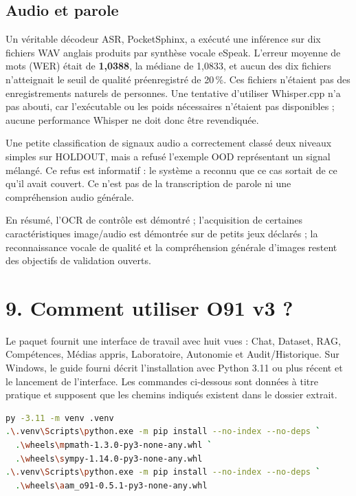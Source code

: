 \documentclass[11pt,a4paper]{article}
\begin{document}
\subsection*{Audio et parole}

Un véritable décodeur ASR, PocketSphinx, a exécuté une inférence sur dix fichiers WAV anglais produits par synthèse vocale eSpeak. L'erreur moyenne de mots (WER) était de \textbf{1,0388}, la médiane de 1,0833, et aucun des dix fichiers n'atteignait le seuil de qualité préenregistré de 20\,\%. Ces fichiers n'étaient pas des enregistrements naturels de personnes. Une tentative d'utiliser Whisper.cpp n'a pas abouti, car l'exécutable ou les poids nécessaires n'étaient pas disponibles ; aucune performance Whisper ne doit donc être revendiquée.

Une petite classification de signaux audio a correctement classé deux niveaux simples sur HOLDOUT, mais a refusé l'exemple OOD représentant un signal mélangé. Ce refus est informatif : le système a reconnu que ce cas sortait de ce qu'il avait couvert. Ce n'est pas de la transcription de parole ni une compréhension audio générale.

En résumé, l'OCR de contrôle est démontré ; l'acquisition de certaines caractéristiques image/audio est démontrée sur de petits jeux déclarés ; la reconnaissance vocale de qualité et la compréhension générale d'images restent des objectifs de validation ouverts.

\section*{9. Comment utiliser O91 v3 ?}

Le paquet fournit une interface de travail avec huit vues : Chat, Dataset, RAG, Compétences, Médias appris, Laboratoire, Autonomie et Audit/Historique. Sur Windows, le guide fourni décrit l'installation avec Python 3.11 ou plus récent et le lancement de l'interface. Les commandes ci-dessous sont données à titre pratique et supposent que les chemins indiqués existent dans le dossier extrait.

\begin{lstlisting}[language=bash,caption={Créer l'environnement et installer les composants locaux fournis}]
py -3.11 -m venv .venv
.\.venv\Scripts\python.exe -m pip install --no-index --no-deps `
  .\wheels\mpmath-1.3.0-py3-none-any.whl `
  .\wheels\sympy-1.14.0-py3-none-any.whl
.\.venv\Scripts\python.exe -m pip install --no-index --no-deps `
  .\wheels\aam_o91-0.5.1-py3-none-any.whl
\end{lstlisting}
\end{document}
